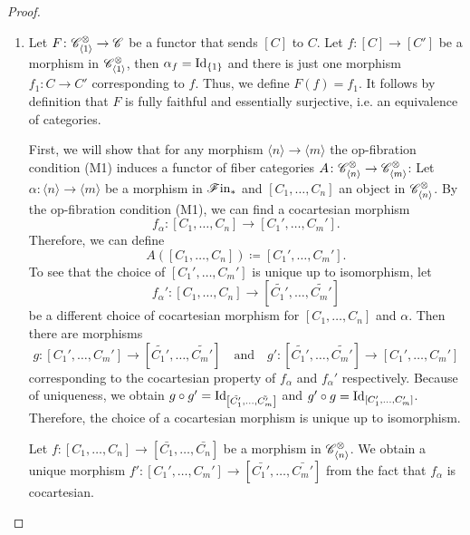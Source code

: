 \begin{proof}
\begin{enumerate}[(M1)]
            \item Let $F \colon \mathscr{C}^{\otimes}_{\langle 1 \rangle} \to \mathscr{C}$ be a
            functor that sends $[C]$ to $C$. Let $f \colon [C] \to [C']$ be a
            morphism in $\mathscr{C}^{\otimes}_{\langle 1 \rangle}$, then $\alpha_f =
            \operatorname{Id}_{\{1\}}$ and there is just one morphism $f_1 \colon C \to C'$
            corresponding to $f$. Thus, we define $F(f) = f_1$. It follows by
            definition that $F$ is fully faithful and essentially surjective,
            i.e. an equivalence of categories.

            First, we will show that for any morphism $\langle n \rangle \to
            \langle m \rangle$ the op-fibration condition (M1) induces a functor
            of fiber categories $A \colon \mathscr{C}^{\otimes}_{\langle n \rangle} \to
            \mathscr{C}^{\otimes}_{\langle m \rangle}$: Let $\alpha \colon \langle n \rangle
            \to \langle m \rangle$ be a morphism in $\mathscr{F} \text{in}_{\ast}$ and $[C_1, \dots,
            C_n]$ an object in $\mathscr{C}^{\otimes}_{\langle n \rangle}$. By the
            op-fibration condition (M1), we can find a cocartesian morphism 
            $$f_{\alpha} \colon [C_1, \dots, C_n] \to [C_1', \dots, C_m'].$$
            Therefore, we can define 
            \[
            A([C_1, \dots, C_n]) \coloneqq [C_1', \dots, C_m'].
            \]
            To see that the choice of $[C_1', \dots, C_m']$ is unique up to
            isomorphism, let 
            $$f_{\alpha}' \colon \left[C_1, \dots, C_n\right] \to
            \left[\tilde{C_1'}, \dots, \tilde{C_m'}\right]$$ be a different
            choice of cocartesian morphism for $\left[C_1, \dots, C_n\right]$
            and $\alpha$. Then there are morphisms 
            \[
            g \colon \left[C_1', \dots, C_m'\right] \to \left[\tilde{C_1'}, \dots, \tilde{C_m'}\right] \quad \text{and} \quad g' \colon \left[\tilde{C_1'}, \dots, \tilde{C_m'}\right] \to \left[C_1', \dots, C_m'\right]
            \]
            corresponding to the cocartesian property of $f_{\alpha}$ and
            $f_{\alpha}'$ respectively. Because of uniqueness, we obtain $g
            \circ g'  = \operatorname{Id}_{\left[\tilde{C_1'}, \dots, \tilde{C_m'}\right]}$
            and $g' \circ g = \operatorname{Id}_{[C_1', \dots, C_m']}$. Therefore, the choice
            of a cocartesian morphism is unique up to isomorphism.
            
            Let $f \colon [C_1, \dots, C_n] \to \left[\bar{C_1}, \dots,
            \bar{C_n}\right]$ be a morphism in $\mathscr{C}^{\otimes}_{\langle n \rangle}$.
            We obtain a unique morphism $f' \colon [C_1', \dots, C_m'] \to
            \left[\bar{C_1'}, \dots, \bar{C_m'}\right]$ from the fact that
            $f_{\alpha}$ is cocartesian.
            

\end{enumerate}
\end{proof}
